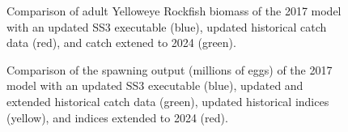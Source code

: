 \documentclass[
]{scrartcl}
\begin{document}
\begin{figure}


\caption{\label{fig-bridge3-comp18}Comparison of adult Yelloweye
Rockfish biomass of the 2017 model with an updated SS3 executable
(blue), updated historical catch data (red), and catch extened to 2024
(green).}

\end{figure}%

\begin{figure}


\caption{\label{fig-bridge5-comp2}Comparison of the spawning output
(millions of eggs) of the 2017 model with an updated SS3 executable
(blue), updated and extended historical catch data (green), updated
historical indices (yellow), and indices extended to 2024 (red).}

\end{figure}%
\end{document}
